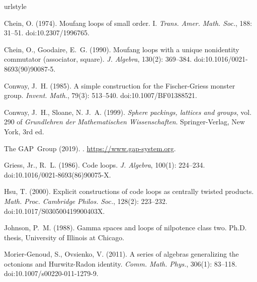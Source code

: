 \documentclass{article}
\theoremstyle{plain}
\theoremstyle{definition}
\begin{document}
\begin{thebibliography}{10}
\expandafter\ifx\csname urlstyle\endcsname\relax
 \providecommand{\doi}[1]{doi:\discretionary{}{}{}#1}\else
 \providecommand{\doi}{doi:\discretionary{}{}{}\begingroup
  \urlstyle{rm}\Url}\fi

Chein, O. (1974).
\newblock Moufang loops of small order. {I}.
\newblock \emph{Trans. Amer. Math. Soc.}, 188: 31--51.
\newblock \doi{10.2307/1996765}.

Chein, O., Goodaire, E.~G. (1990).
\newblock Moufang loops with a unique nonidentity commutator (associator,
  square).
\newblock \emph{J. Algebra}, 130(2): 369--384.
\newblock \doi{10.1016/0021-8693(90)90087-5}.

Conway, J.~H. (1985).
\newblock A simple construction for the {F}ischer-{G}riess monster group.
\newblock \emph{Invent. Math.}, 79(3): 513--540.
\newblock \doi{10.1007/BF01388521}.

Conway, J.~H., Sloane, N. J.~A. (1999).
\newblock \emph{Sphere packings, lattices and groups}, vol. 290 of
  \emph{Grundlehren der Mathematischen Wissenschaften}.
\newblock Springer-Verlag, New York, 3rd ed.

The GAP~Group (2019).
. 
\newblock \url{https://www.gap-system.org}.

Griess, Jr., R.~L. (1986).
\newblock Code loops.
\newblock \emph{J. Algebra}, 100(1): 224--234.
\newblock \doi{10.1016/0021-8693(86)90075-X}.

Hsu, T. (2000).
\newblock Explicit constructions of code loops as centrally twisted products.
\newblock \emph{Math. Proc. Cambridge Philos. Soc.}, 128(2): 223--232.
\newblock \doi{10.1017/S030500419900403X}.

Johnson, P.~M. (1988).
\newblock Gamma spaces and loops of nilpotence class two.
\newblock Ph.D. thesis, University of Illinois at Chicago.


Morier-Genoud, S., Ovsienko, V. (2011).
\newblock A series of algebras generalizing the octonions and {H}urwitz-{R}adon
  identity.
\newblock \emph{Comm. Math. Phys.}, 306(1): 83--118.
\newblock \doi{10.1007/s00220-011-1279-9}.


\end{thebibliography}
\end{document}
